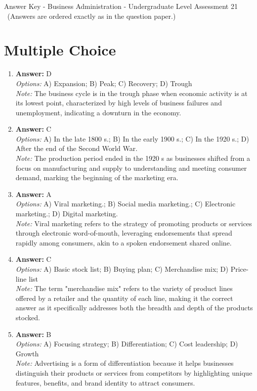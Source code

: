 \documentclass[12pt]{article}
\begin{document}
\begin{center}
Answer Key - Business Administration - Undergraduate Level Assessment 21 \
\small (Answers are ordered exactly as in the question paper.)
\end{center}

\section*{Multiple Choice}
\begin{enumerate}[label=\arabic*.]
\item \textbf{Answer:} D
\\ \textit{Options:} A) Expansion; B) Peak; C) Recovery; D) Trough
\\ \textit{Note:} The business cycle is in the trough phase when economic activity is at its lowest point, characterized by high levels of business failures and unemployment, indicating a downturn in the economy.
\item \textbf{Answer:} C
\\ \textit{Options:} A) In the late 1800 s.; B) In the early 1900 s.; C) In the 1920 s.; D) After the end of the Second World War.
\\ \textit{Note:} The production period ended in the 1920 s as businesses shifted from a focus on manufacturing and supply to understanding and meeting consumer demand, marking the beginning of the marketing era.
\item \textbf{Answer:} A
\\ \textit{Options:} A) Viral marketing.; B) Social media marketing.; C) Electronic marketing.; D) Digital marketing.
\\ \textit{Note:} Viral marketing refers to the strategy of promoting products or services through electronic word-of-mouth, leveraging endorsements that spread rapidly among consumers, akin to a spoken endorsement shared online.
\item \textbf{Answer:} C
\\ \textit{Options:} A) Basic stock list; B) Buying plan; C) Merchandise mix; D) Price-line list
\\ \textit{Note:} The term "merchandise mix" refers to the variety of product lines offered by a retailer and the quantity of each line, making it the correct answer as it specifically addresses both the breadth and depth of the products stocked.
\item \textbf{Answer:} B
\\ \textit{Options:} A) Focusing strategy; B) Differentiation; C) Cost leadership; D) Growth
\\ \textit{Note:} Advertising is a form of differentiation because it helps businesses distinguish their products or services from competitors by highlighting unique features, benefits, and brand identity to attract consumers.
\end{enumerate}
\end{document}
